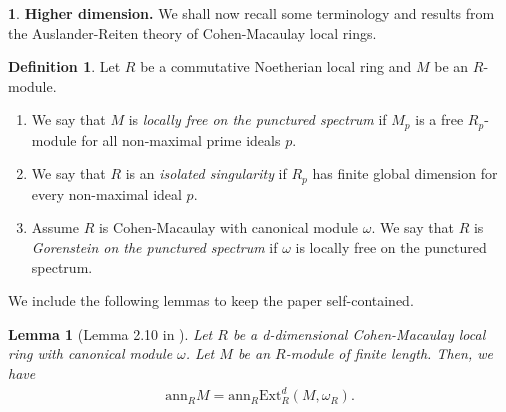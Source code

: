 \documentclass[12pt]{amsart}
\newcommand{\Ext}{\mathrm{Ext}}
\newcommand{\ann}{\mathrm{ann}}
\newtheorem{lemma}[theorem]{Lemma}
\theoremstyle{definition}
\newtheorem{definition}[theorem]{Definition}
\newtheorem{chunk}[theorem]{}
\numberwithin{equation}{theorem}
\begin{document}
\begin{chunk}
    \textbf{Higher dimension.}
We shall now recall some terminology and results from the Auslander-Reiten theory of Cohen-Macaulay local rings.
    
\begin{definition}
    Let $R$ be a commutative Noetherian local ring and $M$ be an $R$-module.
    \begin{enumerate}
        \item We say that $M$ is \textit{locally free on the punctured spectrum} if $M_p$ is a free $R_p$-module for all non-maximal prime ideals $p$.
        \item We say that $R$ is an \textit{isolated singularity} if $R_p$ has finite global dimension for every non-maximal ideal $p$.
        \item Assume $R$ is Cohen-Macaulay with canonical module $\omega$. We say that $R$ is \textit{Gorenstein on the punctured spectrum} if $\omega$ is locally free on the punctured spectrum.
    \end{enumerate}
\end{definition}
We include the following lemmas to keep the paper self-contained.
\begin{lemma}[Lemma 2.10 in \cite{Dao-Kobayashi-Takahashi}]\label{dkt-lemma-210}
    Let $R$ be a d-dimensional Cohen-Macaulay local ring with canonical module $\omega$. Let $M$ be an $R$-module of finite length. Then, we have 
    \begin{align*}
        \ann_R M = \ann_R \Ext_R^d(M, \omega_R).
    \end{align*}
\end{lemma}


\end{chunk}
\end{document}
